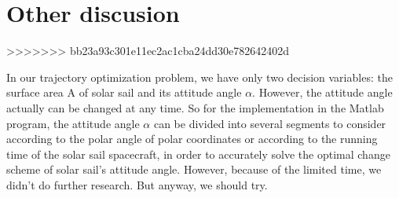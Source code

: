 \documentclass[../Paper.tex]{subfiles}
\begin{document}
\section{Other discusion}
>>>>>>> bb23a93c301e11ec2ac1cba24dd30e782642402d

In our trajectory optimization problem, we have only two decision variables: the surface area A of solar sail and its attitude angle $\alpha$. However, the attitude angle actually can be changed at any time. So for the implementation in the Matlab program, the attitude angle $\alpha$ can be divided into several segments to consider according to the polar angle of polar coordinates or according to the running time of the solar sail spacecraft, in order to accurately solve the optimal change scheme of solar sail's attitude angle. However, because of the limited time, we didn't do further research. But anyway, we should try.
\end{document}
